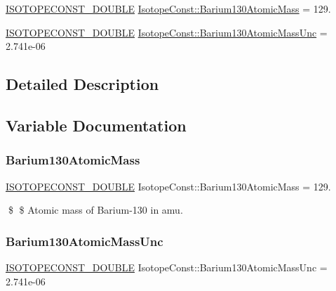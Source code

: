 \begin{DoxyCompactItemize}
\item 
\mbox{\hyperlink{group___isotope_const-_macros_ga8f45a7272ce02c0b4c65c44636ed719a}{I\+S\+O\+T\+O\+P\+E\+C\+O\+N\+S\+T\+\_\+\+D\+O\+U\+B\+LE}} \mbox{\hyperlink{group___isotope_const-_barium-_ba130_gab5ea74133e3e8293eec0865de731c50c}{Isotope\+Const\+::\+Barium130\+Atomic\+Mass}} = 129.
\item 
\mbox{\hyperlink{group___isotope_const-_macros_ga8f45a7272ce02c0b4c65c44636ed719a}{I\+S\+O\+T\+O\+P\+E\+C\+O\+N\+S\+T\+\_\+\+D\+O\+U\+B\+LE}} \mbox{\hyperlink{group___isotope_const-_barium-_ba130_gaf087b2071c2e93c0b64cea412bcd6ef6}{Isotope\+Const\+::\+Barium130\+Atomic\+Mass\+Unc}} = 2.\+741e-\/06
\end{DoxyCompactItemize}


\subsection{Detailed Description}


\subsection{Variable Documentation}
\mbox{\label{group___isotope_const-_barium-_ba130_gab5ea74133e3e8293eec0865de731c50c}} 
\subsubsection{\texorpdfstring{Barium130\+Atomic\+Mass}{Barium130AtomicMass}}
{\footnotesize\ttfamily \mbox{\hyperlink{group___isotope_const-_macros_ga8f45a7272ce02c0b4c65c44636ed719a}{I\+S\+O\+T\+O\+P\+E\+C\+O\+N\+S\+T\+\_\+\+D\+O\+U\+B\+LE}} Isotope\+Const\+::\+Barium130\+Atomic\+Mass = 129.}

\$ \$ Atomic mass of Barium-\/130 in amu. \mbox{\label{group___isotope_const-_barium-_ba130_gaf087b2071c2e93c0b64cea412bcd6ef6}} 
\subsubsection{\texorpdfstring{Barium130\+Atomic\+Mass\+Unc}{Barium130AtomicMassUnc}}
{\footnotesize\ttfamily \mbox{\hyperlink{group___isotope_const-_macros_ga8f45a7272ce02c0b4c65c44636ed719a}{I\+S\+O\+T\+O\+P\+E\+C\+O\+N\+S\+T\+\_\+\+D\+O\+U\+B\+LE}} Isotope\+Const\+::\+Barium130\+Atomic\+Mass\+Unc = 2.\+741e-\/06}

